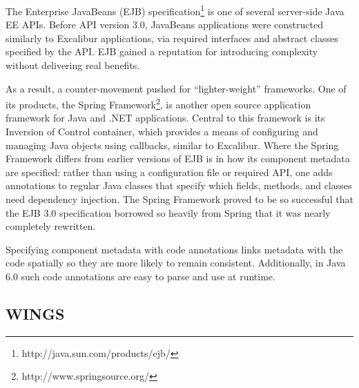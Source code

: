 \documentclass{article}
\begin{document}
The Enterprise JavaBeans (EJB)
specification\footnote{http://java.sun.com/products/ejb/} is one of
several server-side Java EE APIs.  Before API version 3.0, JavaBeans
applications were constructed similarly to Excalibur applications, via
required interfaces and abstract classes specified by the API.  EJB gained
a reputation for introducing complexity without delivering real benefits.

As a result, a counter-movement pushed for ``lighter-weight'' frameworks.
One of its products, the Spring
Framework\footnote{http://www.springsource.org/}, is another open source
application framework for Java and .NET applications.  Central to
this framework is its Inversion of Control container, which provides
a means of configuring and managing Java objects using callbacks,
similar to Excalibur.  Where the Spring Framework differs from earlier
versions of EJB is in how its component metadata are specified: rather
than using a configuration file or required API, one adds annotations to
regular Java classes that specify which fields, methods, and classes need
dependency injection.  The Spring Framework proved to be so successful
that the EJB 3.0 specification borrowed so heavily from Spring that it
was nearly completely rewritten.

Specifying component metadata with code annotations links metadata
with the code spatially so they are more likely to remain consistent.
Additionally, in Java 6.0 such code annotations are easy to parse and
use at runtime.

%

\subsection{WINGS}

\end{document}
